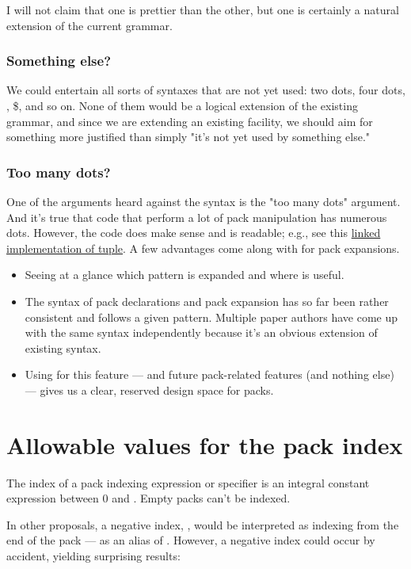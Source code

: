 \documentclass{wg21}
\begin{document}
I will not claim that one is prettier than the other, but one is certainly a natural extension of the current grammar.\subsubsection{Something else?}

We could entertain all sorts of syntaxes that are not yet used: two dots, four dots, \tcode{!},  \$, and so on.
None of them would be a logical extension of the existing grammar, and since we are extending an existing facility, we should aim for something more justified than simply "it's not yet used by something else."

\subsubsection{Too many dots?}

One of the arguments heard against the  syntax is the "too many dots" argument.
And it's true that code that perform a lot of pack manipulation has numerous dots.
However, the code does make sense and is readable; e.g., see this \href{https://github.com/seanbaxter/circle/blob/master/tuple/tuple.hxx}{linked implementation of tuple}.
A few advantages come along with  for pack expansions.
\begin{itemize}
\item Seeing at a glance which pattern is expanded and where is useful.
\item The syntax of pack declarations and pack expansion has so far been rather consistent and follows a given pattern. Multiple paper authors
 have come up with the same syntax independently because it's an obvious extension of existing syntax.
\item Using  for this feature --- and future pack-related features (and nothing else) --- gives us a clear, reserved design space for packs.
\end{itemize}

\section{Allowable values for the pack index}

The index of a pack indexing expression or specifier is an integral constant expression between 0 and .
Empty packs can't be indexed.

In other proposals, a negative index, , would be interpreted as
indexing from the end of the pack --- as an alias of .
However, a negative index could occur by accident, yielding surprising results:
\end{document}
